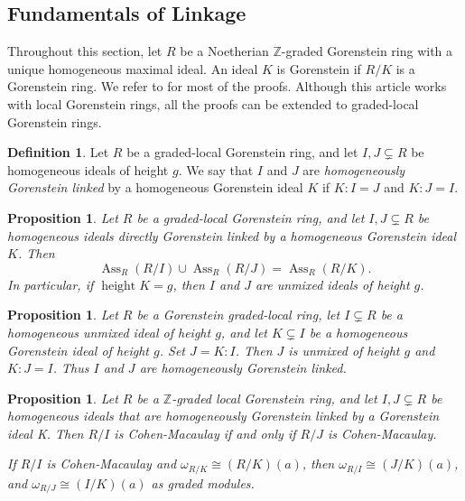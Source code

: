 \documentclass[11pt,letterpaper]{amsart}
\DeclareMathOperator{\Ass}{Ass}
\DeclareMathOperator{\height}{height}
\theoremstyle{plain}
\newtheorem{prop}[thm]{Proposition}
\theoremstyle{definition}
\newtheorem{defi}[thm]{Definition}
\theoremstyle{remark}
\begin{document}
\subsection{Fundamentals of Linkage} Throughout this section, let $R$ be a Noetherian $\mathbb Z$-graded Gorenstein ring with
a unique homogeneous maximal ideal. An ideal $K$ is Gorenstein if $R/K$ is a Gorenstein ring. We refer to \cite{schenzel1982notes} for most of the proofs. Although this article works with local Gorenstein rings, all the proofs can be extended to graded-local Gorenstein rings.%

\begin{defi}
Let \(R\) be a graded-local Gorenstein ring, and let \(I,J\subsetneq R\) be homogeneous ideals of height \(g\). We say that \(I\) and \(J\) are \emph{homogeneously Gorenstein linked} by a homogeneous Gorenstein ideal \(K\) if $K:I=J$ and $K:J=I$.
\end{defi}

\begin{prop}
Let \(R\) be a graded-local Gorenstein ring, and let \(I,J\subsetneq R\) be homogeneous ideals directly Gorenstein linked by a homogeneous Gorenstein ideal \(K\). Then
\[
\Ass_R(R/I)\cup\Ass_R(R/J)=\Ass_R(R/K).
\]
In particular, if \(\height K=g\), then \(I\) and \(J\) are unmixed ideals of height \(g\).
\end{prop}

\begin{prop}\cite[Proposition~2.2]{schenzel1982notes}\label{symetriclinkage}
Let \(R\) be a Gorenstein graded-local ring, let \(I\subsetneq R\) be a homogeneous unmixed ideal of height \(g\), and let \(K\subsetneq I\) be a homogeneous Gorenstein ideal of height \(g\). Set \(J=K:I\). Then \(J\) is unmixed of height \(g\) and $
K:J=I$. Thus \(I\) and \(J\) are homogeneously Gorenstein linked.
\end{prop}
\begin{prop}\cite[Corollary~3.3]{schenzel1982notes}
    Let \(R\) be a $\mathbb{Z}$-graded local Gorenstein ring, and let \(I,J\subsetneq R\) be homogeneous ideals that are homogeneously Gorenstein linked by a Gorenstein ideal K. Then $R/I$ is Cohen-Macaulay if and only if $R/J$ is Cohen-Macaulay.
    
    If \(R/I\) is Cohen-Macaulay and \(\omega_{R/K}\cong (R/K)(a)\), then $\omega_{R/I}\cong (J/K)(a)$, and $\omega_{R/J}\cong (I/K)(a)$ as graded modules.
\end{prop}
\end{document}
